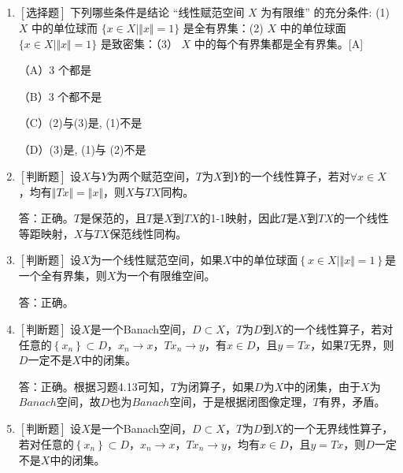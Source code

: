 \documentclass{article}
\begin{document}
\begin{enumerate}
    \item $\left[\textbf{选择题}\right]$ 下列哪些条件是结论 “线性赋范空间 $X$ 为有限维” 的充分条件: (1) $X$ 中的单位球而 $\{x \in X\mid \Vert x\Vert=1\}$ 是全有界集：(2) $X$ 中的单位球面 $\{x \in X\mid \Vert x\Vert=1\}$ 是致密集：（3） $X$ 中的每个有界集都是全有界集。\hfill [A]
    
        \begin{minipage}[t]{0.45\linewidth}
        （A）3 个都是
        \end{minipage}
        \hfill
        \begin{minipage}[t]{0.45\linewidth}
        （B）3 个都不是
        \end{minipage}
        \begin{minipage}[t]{0.45\linewidth}
        （C）(2)与(3)是, (1)不是
        \end{minipage}
        \hfill
        \begin{minipage}[t]{0.45\linewidth}
        （D）(3)是, (1)与 (2)不是
        \end{minipage}
    
    \item $\left[\textbf{判断题}\right]$ 设$X$与$Y$为两个赋范空间，$T$为$X$到$Y$的一个线性算子，若对$\forall x \in X$，均有$\Vert Tx \Vert=\Vert x \Vert$，则$X$与$TX$同构。

    答：正确。$T$是保范的，且$T$是$X$到$TX$的1-1映射，因此$T$是$X$到$TX$的一个线性等距映射，$X$与$TX$保范线性同构。

    \item $\left[\textbf{判断题}\right]$ 设$X$为一个线性赋范空间，如果$X$中的单位球面$\left\{x\in X \mid \Vert x \Vert = 1 \right\}$是一个全有界集，则$X$为一个有限维空间。

    答：正确。

    \item $\left[\textbf{判断题}\right]$ 设$X$是一个Banach空间，$D\subset X$，$T$为$D$到$X$的一个线性算子，若对任意的$\left\{x_n\right\} \subset D$，$x_n \to x$，$Tx_n\to y$，有$x\in D$，且$y=Tx$，如果$T$无界，则$D$一定不是$X$中的闭集。

    答：正确。根据习题4.13可知，$T$为闭算子，如果$D$为$X$中的闭集，由于$X$为$Banach$空间，故$D$也为$Banach$空间，于是根据闭图像定理，$T$有界，矛盾。
    
    \item $\left[\textbf{判断题}\right]$ 设$X$是一个Banach空间，$D\subset X$，$T$为$D$到$X$的一个无界线性算子，若对任意的$\left\{x_n\right\} \subset D$，$x_n \to x$，$Tx_n\to y$，均有$x\in D$，且$y=Tx$，则$D$一定不是$X$中的闭集。


\end{enumerate}
\end{document}
